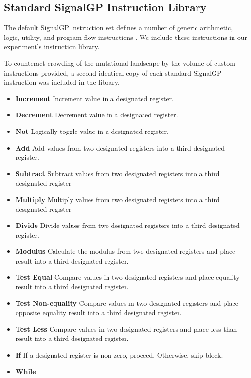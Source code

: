 \subsection{Standard SignalGP Instruction Library} \label{sup:standard_instruction_library}

The default SignalGP instruction set defines a number of generic arithmetic, logic, utility, and program flow instructions \cite{lalejini2018evolving}.
We include these instructions in our experiment's instruction library.

To counteract crowding of the mutational landscape by the volume of custom instructions provided, a second identical copy of each standard SignalGP instruction was included in the library.

\begin{itemize}
\item \textbf{Increment}
Increment value in a designated register.
\item \textbf{Decrement}
Decrement value in a designated register.
\item \textbf{Not}
Logically toggle value in a designated register.
\item \textbf{Add}
Add values from two designated registers into a third designated register.
\item \textbf{Subtract}
Subtract values from two designated registers into a third designated register.
\item \textbf{Multiply}
Multiply values from two designated registers into a third designated register.
\item \textbf{Divide}
Divide values from two designated registers into a third designated register.
\item \textbf{Modulus}
Calculate the modulus from two designated registers and place result into a third designated register.
\item \textbf{Test Equal}
Compare values in two designated registers and place equality result into a third designated register.
\item \textbf{Test Non-equality}
Compare values in two designated registers and place opposite equality result into a third designated register.
\item \textbf{Test Less}
Compare values in two designated registers and place less-than result into a third designated register.
\item \textbf{If}
If a designated register is non-zero, proceed.
Otherwise, skip block.
\item \textbf{While}

\end{itemize}
